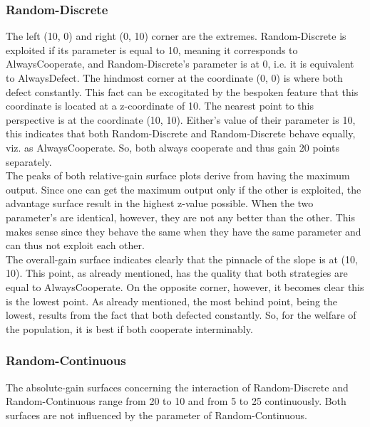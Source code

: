 \documentclass[11pt]{article}
\begin{document}
\subsubsection*{Random-Discrete}
		The left (10, 0) and right (0, 10) corner are the extremes.
		Random-Discrete is exploited if its parameter is equal to 10, meaning it corresponds to AlwaysCooperate, and Random-Discrete's parameter is at 0, i.e. it is equivalent to AlwaysDefect.
		The hindmost corner at the coordinate (0, 0) is where both defect constantly.
		This fact can be excogitated by the bespoken feature that this coordinate is located at a z-coordinate of 10.
		The nearest point to this perspective is at the coordinate (10, 10).
		Either's value of their parameter is 10, this indicates that both Random-Discrete and Random-Discrete behave equally, viz. as AlwaysCooperate.
		So, both always cooperate and thus gain 20 points separately.\\

		The peaks of both relative-gain surface plots derive from having the maximum output.
		Since one can get the maximum output only if the other is exploited, the advantage surface result in the highest z-value possible.
		When the two parameter's are identical, however, they are not any better than the other.
		This makes sense since they behave the same when they have the same parameter and can thus not exploit each other.\\

		The overall-gain surface indicates clearly that the pinnacle of the slope is at (10, 10).
		This point, as already mentioned, has the quality that both strategies are equal to AlwaysCooperate.
		On the opposite corner, however, it becomes clear this is the lowest point.
		As already mentioned, the most behind point, being the lowest, results from the fact that both defected constantly.
		So, for the welfare of the population, it is best if both cooperate interminably.\\


\subsubsection*{Random-Continuous}
		The absolute-gain surfaces concerning the interaction of Random-Discrete and Random-Continuous range from 20 to 10 and from 5 to 25 continuously.
		Both surfaces are not influenced by the parameter of Random-Continuous.\\
\end{document}
